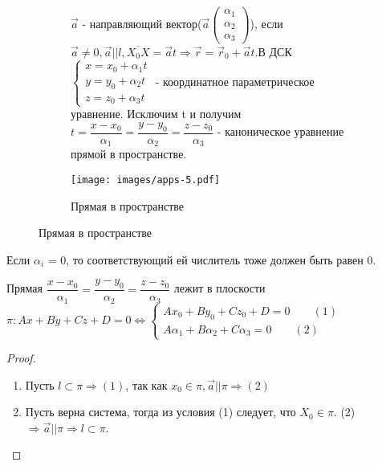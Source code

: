 \vspace{.7cm}
\begin{figure}[h]
	\begin{subfigure}[t!]{0.6\linewidth}
	\(\vec a\) - направляющий вектор(\(\vec a\begin{pmatrix}
		\alpha_1 \\ \alpha_2 \\ \alpha_3
	\end{pmatrix}\)), если $\vec{a}\ne0, \vec a || l, \overline{X_0X} = \vec at \Longrightarrow \vec r = \vec r_0 + \vec at$.\newline В ДСК \(\left\{
	\begin{gathered}
		x = x_0 + \alpha_1t \\
		y = y_0 + \alpha_2t\\
		z = z_0 + \alpha_3t
	\end{gathered}
	\right.\) - координатное параметрическое уравнение.
	Исключим t и получим \(t = \dfrac{x-x_0}{\alpha_1} = \dfrac{y - y_0}{\alpha_2} = \dfrac{z - z_0}{\alpha_3}\) - каноническое уравнение прямой в пространстве.
	\end{subfigure}
	\begin{subfigure}[b!]{0.4\linewidth}
		\centering
		\texttt{[image: images/apps-5.pdf]}
		\caption*{Прямая в пространстве}
		\label{Apps3}
	\end{subfigure}
\end{figure}
\begin{note}
	Если \(\alpha_i\) = 0, то соответствующий ей числитель тоже должен быть равен 0.
\end{note}
\begin{proposition}
	Прямая \(\dfrac{x-x_0}{\alpha_1} = \dfrac{y - y_0}{\alpha_2} = \dfrac{z - z_0}{\alpha_3}\) лежит в плоскости $\pi: Ax+By+Cz+D = 0\Longleftrightarrow\left\{\begin{gathered}
		Ax_0+By_0+Cz_0+D = 0\qquad (1)\\
		A\alpha_1 + B\alpha_2 + C\alpha_3 = 0 \qquad (2)
	\end{gathered}\right.$
\end{proposition}
\begin{proof}
	\begin{enumerate}
		\item Пусть \(l\subset \pi \Longrightarrow (1)\), так как \(x_0\in \pi, \vec a||\pi \Longrightarrow (2)	\)
		\item Пусть верна система, тогда из условия (1) следует, что \(X_0\in\pi\). (2) \(\Longrightarrow \vec a || \pi \Longrightarrow l\subset \pi\).
	\end{enumerate}
\end{proof}
